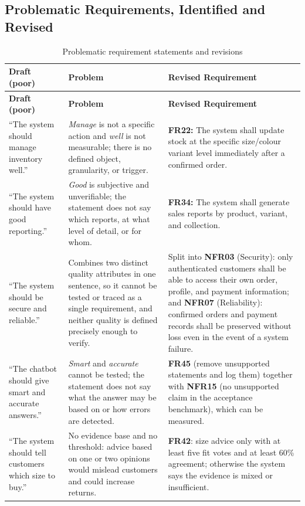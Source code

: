 \documentclass[11pt,a4paper,oneside]{extreport}
\newif\ifshowvtwo
\newcommand{\vtwocolor}{\ifshowvtwo\color{red}\fi}
\newcommand{\R}{\leavevmode\vtwocolor}   %
\begin{document}
\subsection{Problematic Requirements, Identified and Revised}
\begin{xltabular}{\textwidth}{@{}L{3.4cm} L{4.6cm} Y@{}}
\caption{Problematic requirement statements and revisions}\label{tab:revised}\\
\toprule
\textbf{Draft (poor)} & \textbf{Problem} & \textbf{Revised Requirement} \\ \midrule
\endfirsthead
\toprule
\textbf{Draft (poor)} & \textbf{Problem} & \textbf{Revised Requirement} \\ \midrule
\endhead
\bottomrule
\endlastfoot
``The system should manage inventory well.'' & \emph{Manage} is not a specific action and \emph{well} is not measurable; there is no defined object, granularity, or trigger. & \textbf{FR22:} The system shall update stock at the specific size/colour variant level immediately after a confirmed order. \\ \addlinespace
``The system should have good reporting.'' & \emph{Good} is subjective and unverifiable; the statement does not say which reports, at what level of detail, or for whom. & \textbf{FR34:} The system shall generate sales reports by product, variant, and collection. \\ \addlinespace
``The system should be secure and reliable.'' & Combines two distinct quality attributes in one sentence, so it cannot be tested or traced as a single requirement, and neither quality is defined precisely enough to verify. & Split into \textbf{NFR03} (Security): only authenticated customers shall be able to access their own order, profile, and payment information; and \textbf{NFR07} (Reliability): confirmed orders and payment records shall be preserved without loss even in the event of a system failure. \\ \addlinespace
\R ``The chatbot should give smart and accurate answers.'' & \R \emph{Smart} and \emph{accurate} cannot be tested; the statement does not say what the answer may be based on or how errors are detected. & \R \textbf{FR45} (remove unsupported statements and log them) together with \textbf{NFR15} (no unsupported claim in the acceptance benchmark), which can be measured. \\ \addlinespace
\R ``The system should tell customers which size to buy.'' & \R No evidence base and no threshold: advice based on one or two opinions would mislead customers and could increase returns. & \R \textbf{FR42}: size advice only with at least five fit votes and at least 60\% agreement; otherwise the system says the evidence is mixed or insufficient. \\
\end{xltabular}
\end{document}
